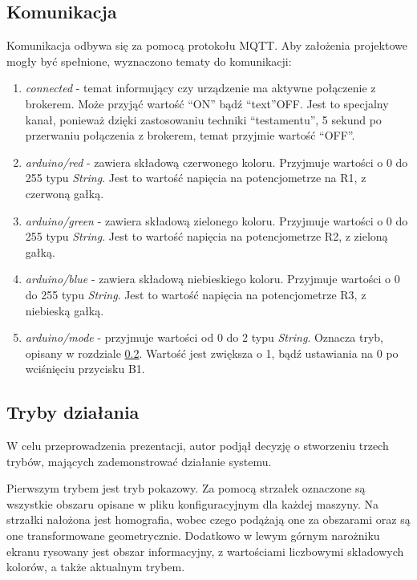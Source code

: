 \documentclass[12pt,twoside,polish]{article}
\begin{document}
\subsection{Komunikacja}
Komunikacja odbywa się za pomocą protokołu MQTT. Aby założenia projektowe mogły być spełnione, wyznaczono tematy do komunikacji:
\begin{enumerate}
	\item \emph{connected} - temat informujący czy urządzenie ma aktywne połączenie z brokerem. Może przyjąć wartość \enquote{ON} bądź \enquote{text}{OFF}. Jest to specjalny kanał, ponieważ dzięki zastosowaniu techniki \enquote{testamentu}, 5 sekund po przerwaniu połączenia z brokerem, temat przyjmie wartość \enquote{OFF}.
	\item \emph{arduino/red} - zawiera składową czerwonego koloru. Przyjmuje wartości o 0 do 255 typu \emph{String}. Jest to wartość napięcia na potencjometrze na R1, z czerwoną gałką.
	\item \emph{arduino/green} - zawiera składową zielonego koloru. Przyjmuje wartości o 0 do 255 typu \emph{String}. Jest to wartość napięcia na potencjometrze  R2, z zieloną gałką.
	\item \emph{arduino/blue} - zawiera składową niebieskiego koloru. Przyjmuje wartości o 0 do 255 typu \emph{String}. Jest to wartość napięcia na  potencjometrze R3, z niebieską gałką.
	\item \emph{arduino/mode} - przyjmuje wartości od 0 do 2 typu \emph{String}. Oznacza tryb, opisany w rozdziale \ref{subsection:mode}. Wartość jest zwiększa o 1, bądź ustawiania na 0 po wciśnięciu przycisku B1.
\end{enumerate}

\subsection{Tryby działania}
\label{subsection:mode}
W celu przeprowadzenia prezentacji, autor podjął decyzję o stworzeniu trzech trybów, mających zademonstrować działanie systemu.

Pierwszym trybem jest tryb pokazowy. Za pomocą strzałek oznaczone są wszystkie obszaru opisane w pliku konfiguracyjnym dla każdej maszyny. Na strzałki nałożona jest homografia, wobec czego podążają one za obszarami oraz są one transformowane geometrycznie. Dodatkowo w lewym górnym narożniku ekranu rysowany jest obszar informacyjny, z wartościami liczbowymi składowych kolorów, a także aktualnym trybem.
\end{document}
